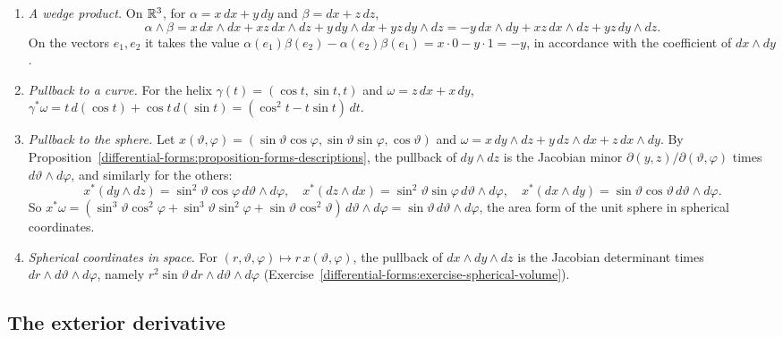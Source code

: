 \begin{example}\label{differential-forms:example-form-computations}
\begin{enumerate}
\item \emph{A wedge product.} On $\mathbb{R}^3$, for $\alpha = x\,dx + y\,dy$ and $\beta = dx + z\,dz$,
\[
\alpha \wedge \beta = x\,dx \wedge dx + xz\,dx \wedge dz + y\,dy \wedge dx + yz\,dy \wedge dz = -y\,dx \wedge dy + xz\,dx \wedge dz + yz\,dy \wedge dz .
\]
On the vectors $e_1, e_2$ it takes the value $\alpha(e_1)\beta(e_2) - \alpha(e_2)\beta(e_1) = x \cdot 0 - y \cdot 1 = -y$, in accordance with the coefficient of $dx \wedge dy$.
\item \emph{Pullback to a curve.} For the helix $\gamma(t) = (\cos t, \sin t, t)$ and $\omega = z\,dx + x\,dy$,
$\gamma^*\omega = t\,d(\cos t) + \cos t\,d(\sin t) = (\cos^2t - t\sin t)\,dt$.
\item \emph{Pullback to the sphere.} Let $x(\vartheta, \varphi) = (\sin\vartheta\cos\varphi, \sin\vartheta\sin\varphi, \cos\vartheta)$ and $\omega = x\,dy \wedge dz + y\,dz \wedge dx + z\,dx \wedge dy$. By
Proposition~\ref{differential-forms:proposition-forms-descriptions}, the pullback of $dy \wedge dz$ is the Jacobian minor $\partial(y, z)/\partial(\vartheta, \varphi)$ times
$d\vartheta \wedge d\varphi$, and similarly for the others:
\[
x^*(dy \wedge dz) = \sin^2\vartheta\cos\varphi\,d\vartheta \wedge d\varphi, \quad x^*(dz \wedge dx) = \sin^2\vartheta\sin\varphi\,d\vartheta \wedge d\varphi, \quad
x^*(dx \wedge dy) = \sin\vartheta\cos\vartheta\,d\vartheta \wedge d\varphi .
\]
So $x^*\omega = (\sin^3\vartheta\cos^2\varphi + \sin^3\vartheta\sin^2\varphi + \sin\vartheta\cos^2\vartheta)\,d\vartheta \wedge d\varphi = \sin\vartheta\,d\vartheta \wedge d\varphi$, the area form of the
unit sphere in spherical coordinates.
\item \emph{Spherical coordinates in space.} For $(r, \vartheta, \varphi) \mapsto r\,x(\vartheta, \varphi)$, the pullback of $dx \wedge dy \wedge dz$ is the Jacobian determinant times
$dr \wedge d\vartheta \wedge d\varphi$, namely $r^2\sin\vartheta\,dr \wedge d\vartheta \wedge d\varphi$ (Exercise~\ref{differential-forms:exercise-spherical-volume}).
\end{enumerate}
\end{example}

\subsection{The exterior derivative}\label{differential-forms:subsection-exterior-derivative}

